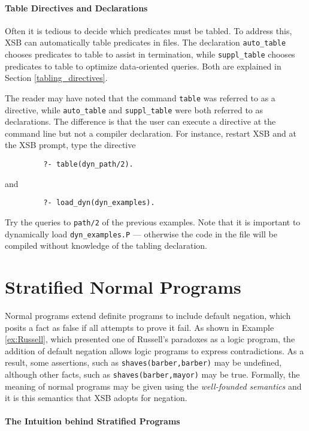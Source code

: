 \paragraph*{Table Directives and Declarations}
Often it is tedious to decide which predicates must be tabled.  To
address this, XSB can automatically table predicates in files.  The
declaration {\tt auto\_table} chooses predicates to table to assist in
termination, while {\tt suppl\_table} chooses predicates to table to
optimize data-oriented queries.  Both are explained in Section
\ref{tabling_directives}.

\begin{exercise}
The reader may have noted that the command {\tt table} was referred to
as a directive, while {\tt auto\_table} and {\tt suppl\_table} were
both referred to as declarations.  The difference is that the user can
execute a directive at the command line but not a compiler declaration.
For instance, restart XSB and at the XSB prompt, type the directive
\begin{verbatim}
         ?- table(dyn_path/2).
\end{verbatim}
and 
\begin{verbatim}
         ?- load_dyn(dyn_examples).
\end{verbatim}
Try the queries to {\tt path/2} of the previous examples.  Note that
it is important to dynamically load {\tt dyn\_examples.P} ---
otherwise the code in the file will be compiled without knowledge of
the tabling declaration.
\end{exercise}

\section{Stratified Normal Programs}

Normal programs extend definite programs to include default negation,
which posits a fact as false if all attempts to prove it fail.  As
shown in Example \ref{ex:Russell}, which presented one of Russell's
paradoxes as a logic program, the addition of default negation allows
logic programs to express contradictions.  As a result, some
assertions, such as {\tt shaves(barber,barber)} may be undefined,
although other facts, such as {\tt shaves(barber,mayor)} may be true.
Formally, the meaning of normal programs may be given using the {\em
well-founded semantics} and it is this semantics that XSB adopts for
negation.

\paragraph*{The Intuition behind Stratified Programs}

